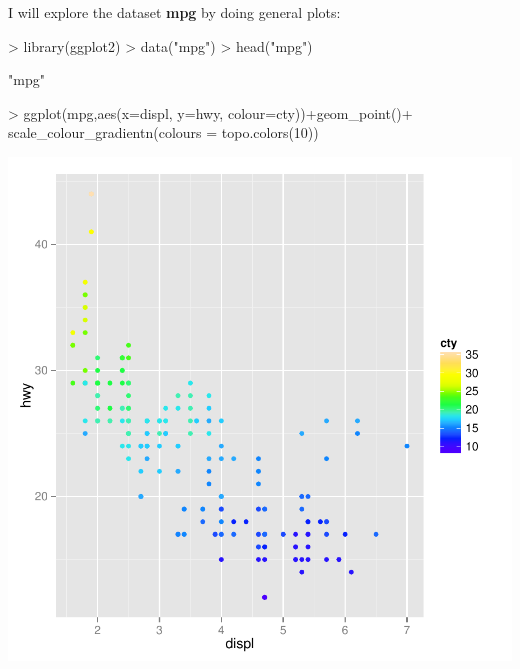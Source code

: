 \documentclass{article}
\begin{document}


I will explore the dataset \textbf{mpg} by doing general plots:

\begin{Schunk}
\begin{Sinput}
> library(ggplot2)
> data("mpg")
> head("mpg")
\end{Sinput}
\begin{Soutput}
[1] "mpg"
\end{Soutput}
\begin{Sinput}
> ggplot(mpg,aes(x=displ, y=hwy, colour=cty))+geom_point()+ scale_colour_gradientn(colours = topo.colors(10))
\end{Sinput}
\end{Schunk}
\includegraphics{tutorialJY-Cars1}
\end{document}
